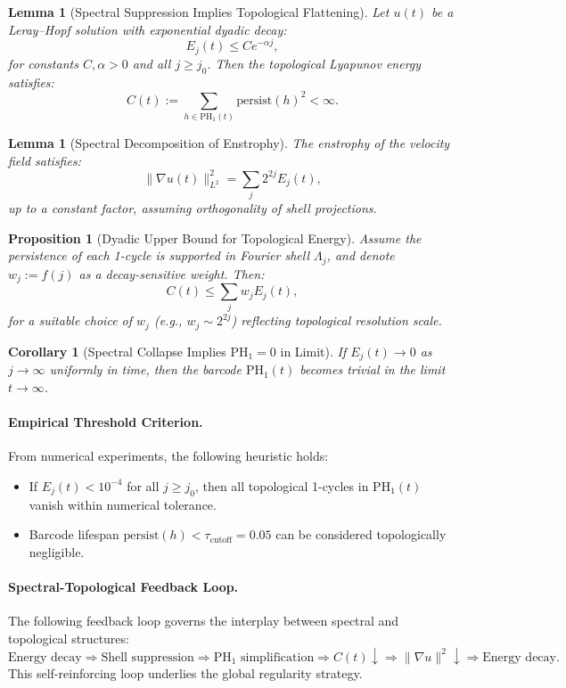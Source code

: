 \documentclass[11pt]{article}
\newtheorem{lemma}[theorem]{Lemma}
\newtheorem{proposition}[theorem]{Proposition}
\newtheorem{corollary}[theorem]{Corollary}
\theoremstyle{definition}
\begin{document}
\begin{lemma}[Spectral Suppression Implies Topological Flattening]
Let \( u(t) \) be a Leray--Hopf solution with exponential dyadic decay:
\[ 
E_j(t) \leq C e^{-\alpha j},
\]
for constants \( C, \alpha > 0 \) and all \( j \geq j_0 \). Then the topological Lyapunov energy satisfies:
\[ 
C(t) := \sum_{h \in \mathrm{PH}_1(t)} \text{persist}(h)^2 < \infty.
\]
\end{lemma}

\begin{lemma}[Spectral Decomposition of Enstrophy]
The enstrophy of the velocity field satisfies:
\[ 
\|\nabla u(t)\|_{L^2}^2 = \sum_j 2^{2j} E_j(t),
\]
up to a constant factor, assuming orthogonality of shell projections.
\end{lemma}

\begin{proposition}[Dyadic Upper Bound for Topological Energy]
Assume the persistence of each 1-cycle is supported in Fourier shell \( \Lambda_j \), and denote
\( w_j := f(j) \) as a decay-sensitive weight. Then:
\[ 
C(t) \leq \sum_j w_j E_j(t),
\]
for a suitable choice of \( w_j \) (e.g., \( w_j \sim 2^{2j} \)) reflecting topological resolution scale.
\end{proposition}

\begin{corollary}[Spectral Collapse Implies \( \mathrm{PH}_1 = 0 \) in Limit]
If \( E_j(t) \to 0 \) as \( j \to \infty \) uniformly in time, then the barcode \( \mathrm{PH}_1(t) \) becomes trivial in the limit
\( t \to \infty \).
\end{corollary}

\paragraph{Empirical Threshold Criterion.} From numerical experiments, the following heuristic holds:
\begin{itemize}
  \item If \( E_j(t) < 10^{-4} \) for all \( j \geq j_0 \), then all topological 1-cycles in \( \mathrm{PH}_1(t) \) vanish within numerical tolerance.
  \item Barcode lifespan \( \text{persist}(h) < \tau_{\text{cutoff}} = 0.05 \) can be considered topologically negligible.
\end{itemize}

\paragraph{Spectral-Topological Feedback Loop.} The following feedback loop governs the interplay between spectral and topological structures:
\[ 
\text{Energy decay} \Rightarrow \text{Shell suppression} \Rightarrow \mathrm{PH}_1 \text{ simplification} \Rightarrow C(t) \downarrow \Rightarrow \|\nabla u\|^2 \downarrow \Rightarrow \text{Energy decay}.
\]
This self-reinforcing loop underlies the global regularity strategy.
\end{document}
